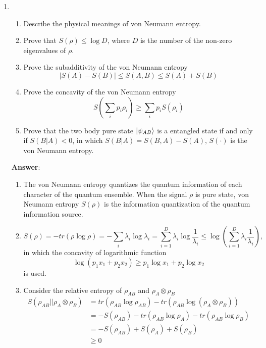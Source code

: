 \documentclass[english,aps,onecolumn]{revtex4-1}
\begin{document}
\begin{enumerate}[1.]
\item
	\begin{enumerate}[(1)]
	\item Describe the physical meanings of von Neumann entropy.
	\item Prove that $S(\rho)\leq \log D$, where $D$ is the number of the non-zero eigenvalues of $\rho$.
    \item Prove the subadditivity of the von Neumann entropy
        $$|S(A)-S(B)| \leq S(A,B) \leq S(A)+S(B)$$
    \item Prove the concavity of the von Neumann entropy
        $$S(\sum_i{p_i \rho_i}) \geq \sum_i{p_i S(\rho_i)}$$

    \item Prove that the two body pure state $\ket{\psi_{AB}}$ is a entangled state if and only if $S(B|A) <0 $, in which $S(B|A)=S(B,A)-S(A)$, $S(\cdot)$ is the von Neumann entropy.
	\end{enumerate}

\textbf{Answer}:
	\begin{enumerate}[(1)]
	\item
	 The von Neumann entropy quantizes the quantum information of each character of the quantum ensemble. When the signal $\rho$ is pure state, von Neumann entropy $S(\rho)$ is the information quantization of the quantum information source.
	\item
	$$S(\rho)=-tr(\rho \log \rho)=-\sum_i \lambda_i \log \lambda_i=\sum_{i=1}^D\lambda_i \log \frac{1}{\lambda_i} \leq \log(\sum_{i=1}^D\lambda_i\frac{1}{\lambda_i}),$$
	in which the concavity of logarithmic function
	$$\log(p_1 x_1+p_2 x_2) \geq p_1 \log x_1+ p_2 \log x_2$$
	is used.
	

    \item
    Consider the relative entropy of $\rho_{AB}$ and $\rho_A \otimes \rho_B$
    \begin{align*}
    S(\rho_{AB}||\rho_A \otimes \rho_B)
    &= tr(\rho_{AB} \log \rho_{AB}) - tr(\rho_{AB} \log(\rho_A \otimes \rho_B))\\
    &= -S(\rho_{AB}) -tr(\rho_{AB} \log \rho_A) -tr(\rho_{AB} \log \rho_B)\\
    &= -S(\rho_{AB})+S(\rho_A) +S(\rho_B)\\
    &\geq 0
    \end{align*}


\end{enumerate}
\end{enumerate}
\end{document}
